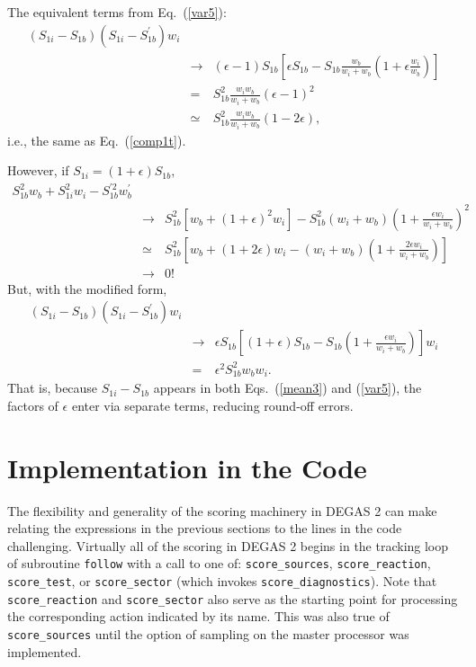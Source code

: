 \documentclass[12pt]{report}
\begin{document}
The equivalent terms from Eq.~(\ref{var5}):
\begin{eqnarray}
(S_{1i} - S_{1b})(S_{1i} - S_{1b}^{\prime}) w_{i} & \quad & \\
& \rightarrow & (\epsilon - 1) S_{1b} [\epsilon S_{1b}  
- S_{1b} \frac{w_{b}}{w_{i}+w_{b}}(1 + \epsilon \frac{w_{i}}{w_{b}}) ] \\
& = & S_{1b}^{2} \frac{w_{i} w_{b}}{w_{i} + w_{b}}(\epsilon - 1)^{2} \\
& \simeq & S_{1b}^{2} \frac{w_{i} w_{b}}{w_{i} + w_{b}} (1 - 2 \epsilon),
\label{comp1n}
\end{eqnarray}
i.e., the same as Eq.~(\ref{comp1t}).

However, if $S_{1i} = (1 + \epsilon) S_{1b}$,
\begin{eqnarray}
S_{1b}^{2} w_{b} + S_{1i}^{2} w_{i} - S_{1b}^{\prime 2} w_{b}^{\prime} & \quad & \\
&\rightarrow& S_{1b}^{2}[w_{b} + (1 + \epsilon)^{2} w_{i}] 
- S_{1b}^{2}(w_{i}+w_{b})(1 + \frac{\epsilon w_{i}}{w_{i}+w_{b}})^{2} \\
& \simeq & S_{1b}^{2} [ w_{b} + (1 + 2 \epsilon ) w_{i} - (w_{i}+w_{b})
(1 + \frac{2 \epsilon w_{i} }{w_{i} + w_{b}}) ] \\
& \rightarrow & 0!
\end{eqnarray}
But, with the modified form, 
\begin{eqnarray}
(S_{1i} - S_{1b})(S_{1i} - S_{1b}^{\prime}) w_{i} & \quad & \\
& \rightarrow & \epsilon S_{1b} [ (1 + \epsilon) S_{1b} - S_{1b}(1 
+ \frac{\epsilon w_{i}}{w_{i} + w_{b}})] w_{i} \\
& = & \epsilon^{2} S_{1b}^{2} w_{b} w_{i}.
\end{eqnarray}
That is, because $S_{1i} - S_{1b}$ appears in both Eqs.~(\ref{mean3})
and (\ref{var5}), the factors of $\epsilon$ enter via separate
terms, reducing round-off errors.

\section{Implementation in the Code}
\label{implementation}

The flexibility and generality of the scoring machinery in
DEGAS 2 can make relating the expressions in the previous
sections to the lines in the code challenging. 
Virtually all of the scoring in DEGAS 2 begins
in the tracking loop of subroutine {\tt follow}
with a
call to one of: {\tt score\_sources}, {\tt score\_reaction},
{\tt score\_test}, or {\tt score\_sector} (which invokes
{\tt score\_diagnostics}).
Note that {\tt score\_reaction} and
{\tt score\_sector} also serve as 
the
starting point for processing the corresponding action
indicated by its name.
This was also true of {\tt score\_sources} until the option
of sampling on the master processor was implemented.
\end{document}
